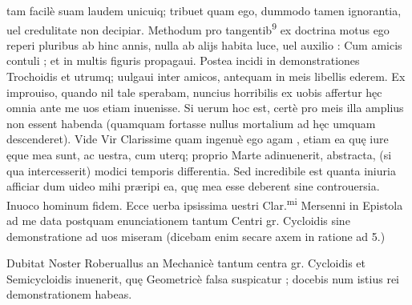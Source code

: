\documentclass[11pt,a4paper]{article}
\begin{document}
tam facilè suam laudem unicuiq; tribuet quam ego, dummodo tamen ignorantia, uel credulitate non decipiar. Methodum pro tangentib\textsuperscript{9} ex doctrina motus ego reperi pluribus ab hinc annis, nulla ab alijs habita luce, uel auxilio : Cum amicis contuli ; et in multis figuris propagaui. Postea incidi in demonstrationes Trochoidis et utrumq; uulgaui inter amicos, antequam in meis libellis ederem. Ex improuiso, quando nil tale sperabam, nuncius horribilis ex uobis affertur hęc omnia ante me uos etiam inuenisse. Si uerum hoc est, certè pro meis illa amplius non essent habenda (quamquam fortasse nullus mortalium ad hęc umquam descenderet). Vide Vir Clarissime quam ingenuè ego agam , etiam ea quę iure ęque mea sunt, ac uestra, cum uterq; proprio Marte adinuenerit, abstracta, (si qua intercesserit) modici temporis differentia. Sed incredibile est quanta iniuria afficiar dum uideo mihi præripi ea, quę mea esse deberent sine controuersia. Inuoco hominum fidem. Ecce uerba ipsissima uestri Clar.\textsuperscript{mi} Mersenni in Epistola ad me data postquam enunciationem tantum Centri gr. Cycloidis sine demonstratione ad uos miseram (dicebam enim secare axem in ratione  ad 5.)

Dubitat Noster Roberuallus an Mechanicè tantum centra gr. Cycloidis et Semicycloidis inuenerit, quę Geometricè falsa suspicatur ; docebis num istius rei demonstrationem habeas.

\end{document}
